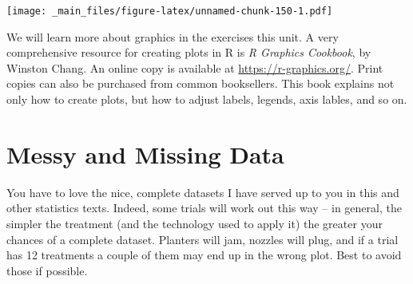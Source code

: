 \documentclass[
]{book}
\newenvironment{Shaded}{\begin{snugshade}}{\end{snugshade}}
\newcommand{\AttributeTok}[1]{\textcolor[rgb]{0.77,0.63,0.00}{#1}}
\newcommand{\DecValTok}[1]{\textcolor[rgb]{0.00,0.00,0.81}{#1}}
\newcommand{\FunctionTok}[1]{\textcolor[rgb]{0.00,0.00,0.00}{#1}}
\newcommand{\NormalTok}[1]{#1}
\newcommand{\SpecialCharTok}[1]{\textcolor[rgb]{0.00,0.00,0.00}{#1}}
\newcommand{\StringTok}[1]{\textcolor[rgb]{0.31,0.60,0.02}{#1}}
\begin{document}
\begin{Shaded}
\end{Shaded}

\texttt{[image: \_main\_files/figure-latex/unnamed-chunk-150-1.pdf]}

We will learn more about graphics in the exercises this unit. A very comprehensive resource for creating plots in R is \emph{R Graphics Cookbook}, by Winston Chang. An online copy is available at \url{https://r-graphics.org/}. Print copies can also be purchased from common booksellers. This book explains not only how to create plots, but how to adjust labels, legends, axis lables, and so on.

\hypertarget{messy-and-missing-data}{%
\chapter{Messy and Missing Data}\label{messy-and-missing-data}}

You have to love the nice, complete datasets I have served up to you in this and other statistics texts. Indeed, some trials will work out this way -- in general, the simpler the treatment (and the technology used to apply it) the greater your chances of a complete dataset. Planters will jam, nozzles will plug, and if a trial has 12 treatments a couple of them may end up in the wrong plot. Best to avoid those if possible.
\end{document}

